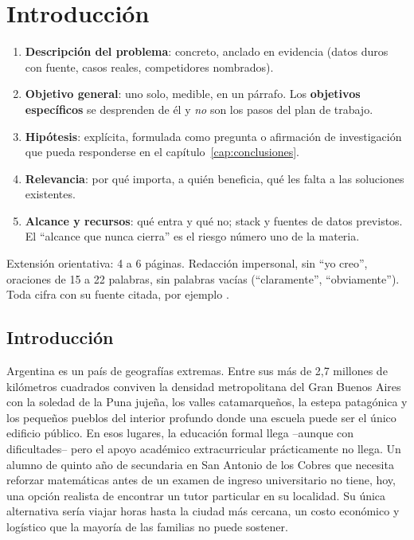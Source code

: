 
\chapter{Introducción}\label{cap:introduccion}

\begin{guia}
\begin{enumerate}
    \item \textbf{Descripción del problema}: concreto, anclado en evidencia
          (datos duros con fuente, casos reales, competidores nombrados).
    \item \textbf{Objetivo general}: uno solo, medible, en un párrafo.
          Los \textbf{objetivos específicos} se desprenden de él y
          \emph{no} son los pasos del plan de trabajo.
    \item \textbf{Hipótesis}: explícita, formulada como pregunta o
          afirmación de investigación que pueda responderse en el
          capítulo~\ref{cap:conclusiones}.
    \item \textbf{Relevancia}: por qué importa, a quién beneficia, qué les
          falta a las soluciones existentes.
    \item \textbf{Alcance y recursos}: qué entra y qué no; stack y fuentes
          de datos previstos. El ``alcance que nunca cierra'' es el riesgo
          número uno de la materia.
\end{enumerate}
Extensión orientativa: 4 a 6 páginas. Redacción impersonal, sin ``yo
creo'', oraciones de 15 a 22 palabras, sin palabras vacías
(``claramente'', ``obviamente''). Toda cifra con su fuente citada, por
ejemplo \citep{breiman2001}.
\end{guia}

\section{Introducción}\label{sec:intro-general}

Argentina es un país de geografías extremas. Entre sus más de 2,7
millones de kilómetros cuadrados conviven la densidad metropolitana del
Gran Buenos Aires con la soledad de la Puna jujeña, los valles
catamarqueños, la estepa patagónica y los pequeños pueblos del interior
profundo donde una escuela puede ser el único edificio público. En esos
lugares, la educación formal llega --aunque con dificultades-- pero el
apoyo académico extracurricular prácticamente no llega. Un alumno de
quinto año de secundaria en San Antonio de los Cobres que necesita
reforzar matemáticas antes de un examen de ingreso universitario no
tiene, hoy, una opción realista de encontrar un tutor particular en su
localidad. Su única alternativa sería viajar horas hasta la ciudad más
cercana, un costo económico y logístico que la mayoría de las familias
no puede sostener.

